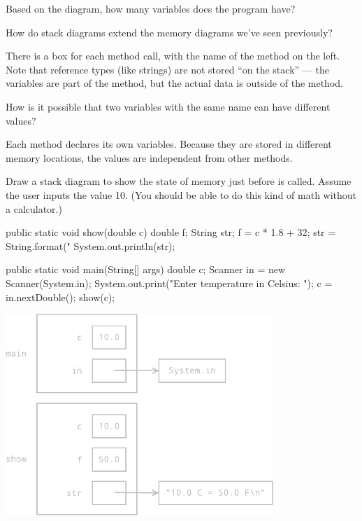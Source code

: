 \Q Based on the diagram, how many variables does the program have? 
\vspace{1em}


\Q How do stack diagrams extend the memory diagrams we've seen previously?

\begin{answer}[5em]
There is a box for each method call, with the name of the method on the left.
Note that reference types (like strings) are not stored ``on the stack'' --- the variables are part of the method, but the actual data is outside of the method.
\end{answer}


\Q How is it possible that two variables with the same name can have different values?

\begin{answer}
Each method declares its own variables.
Because they are stored in different memory locations, the values are independent from other methods.
\end{answer}


\Q \label{drawing}
Draw a stack diagram to show the state of memory just before  is called.
Assume the user inputs the value 10.
(You should be able to do this kind of math without a calculator.)

\vspace{1ex}
\begin{javalst}
    public static void show(double c) {
        double f;
        String str;
        f = c * 1.8 + 32;
        str = String.format("%
        System.out.println(str);
    }

    public static void main(String[] args) {
        double c;
        Scanner in = new Scanner(System.in);
        System.out.print("Enter temperature in Celsius: ");
        c = in.nextDouble();
        show(c);
    }
\end{javalst}
\vspace{-1ex}

\begin{answer}[3.1in]
\hfill
\includegraphics[height=3in]{stack2.pdf}
\end{answer}


